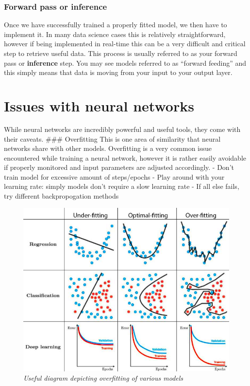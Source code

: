 \documentclass[
]{article}
\begin{document}
\hypertarget{forward-pass-or-inference}{%
\subsubsection{Forward pass or
inference}\label{forward-pass-or-inference}}

Once we have successfully trained a properly fitted model, we then have
to implement it. In many data science cases this is relatively
straightforward, however if being implemented in real-time this can be a
very difficult and critical step to retrieve useful data. This process
is usually referred to as your forward pass or \textbf{inference} step.
You may see models referred to as ``forward feeding'' and this simply
means that data is moving from your input to your output layer.

\hypertarget{issues-with-neural-networks}{%
\section{Issues with neural
networks}\label{issues-with-neural-networks}}

While neural networks are incredibly powerful and useful tools, they
come with their caveats. \#\#\# Overfitting This is one area of
similarity that neural networks share with other models. Overfitting is
a very common issue encountered while training a neural network, however
it is rather easily avoidable if properly monitored and input parameters
are adjusted accordingly. - Don't train model for excessive amount of
steps/epochs - Play around with your learning rate: simply models don't
require a slow learning rate - If all else fails, try different
backpropogation methods

\begin{figure}
\centering
\includegraphics{media/overfittingDiagram.png}
\caption{\emph{Useful diagram depicting overfitting of various models}}
\end{figure}
\end{document}
